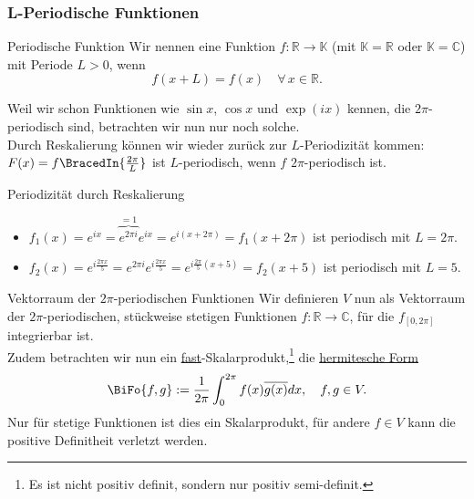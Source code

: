 \subsubsection{L-Periodische Funktionen}
\begin{Def}
{Periodische Funktion}
Wir nennen eine Funktion $f:\mathbb{R}\to\mathbb{K}$ (mit $\mathbb{K}=\mathbb{R}$ oder $\mathbb{K}=\mathbb{C}$)  mit Periode $L>0$, wenn
\begin{equation*}
    f(x+L)=f(x)\quad \forall\, x\in\mathbb{R}.
\end{equation*}
\end{Def}
Weil wir schon Funktionen wie $\sin x$, $\cos x$ und $\exp (ix)$ kennen, die $2\pi$-periodisch sind, betrachten wir nun nur noch solche.\\
Durch Reskalierung können wir wieder zurück zur $L$-Periodizität kommen: $F(x)=f\BracedIn{\frac{2\pi}{L}}$ ist $L$-periodisch, wenn $f$ $2\pi$-periodisch ist.
\begin{Beispiel}
{Periodizität durch Reskalierung}
\begin{itemize}
    \item $f_1(x)=e^{ix}=\overbrace{e^{2\pi i}}^{=1}e^{ix}=e^{i(x+2\pi)}=f_1(x+2\pi)$ ist periodisch mit $L=2\pi$.
    \item $f_2(x)=e^{i\frac{2\pi x}{5}}=e^{2\pi i}e^{i\frac{2\pi x}{5}}=e^{i\frac{2\pi}{5}(x+5)}=f_2(x+5)$ ist periodisch mit $L=5$.
\end{itemize}
\end{Beispiel}
\begin{Def}
{Vektorraum der $2\pi$-periodischen Funktionen}
Wir definieren $V$ nun als Vektorraum der $2\pi$-periodischen, stückweise stetigen Funktionen $f:\mathbb{R}\to\mathbb{C}$, für die $f_{[0,2\pi]}$ integrierbar ist.\\
Zudem betrachten wir nun ein \underline{fast}-Skalarprodukt,\footnote{Es ist nicht positiv definit, sondern nur positiv semi-definit.} die \underline{hermitesche Form}
\begin{equation}
    \BiFo{f, g}:=\frac{1}{2\pi}\int_0^{2\pi}f(x)\overline{g(x)}dx,\quad f,g\in V.
\end{equation}
Nur für stetige Funktionen ist dies ein Skalarprodukt, für andere $f\in V$ kann die positive Definitheit verletzt werden.
\end{Def}
